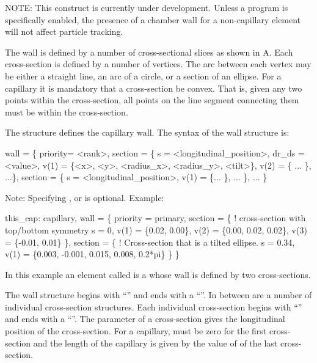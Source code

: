 NOTE: This construct is currently under development. Unless a program
is specifically enabled, the presence of a chamber wall for a
non-capillary element will not affect particle tracking.

The wall is defined by a number of cross-sectional slices as shown in
A. Each cross-section is defined by a number of
vertices. The arc between each vertex may be either a straight line,
an arc of a circle, or a section of an ellipse. For a capillary it is
mandatory that a cross-section be convex. That is, given any two
points within the cross-section, all points on the line segment
connecting them must be within the cross-section.

The  structure defines the capillary wall. The
syntax of the wall structure is:
\begin{example}
  wall = \{
    priority= <rank>,
    section = \{ 
      s = <longitudinal_position>, 
      dr_ds = <value>,
      v(1) = \{<x>, <y>, <radius_x>, <radius_y>, <tilt>\}, 
      v(2) = \{ ... \},
      ...\},
    section = \{
      s = <longitudinal_position>, 
      v(1) = \{... \},
      ... \},
    ... \}
\end{example}
Note: Specifying ,  or
 is optional. Example:
\begin{example}
  this_cap: capillary, 
    wall = \{   
      priority = primary,
      section = \{ ! cross-section with top/bottom symmetry
        s = 0, v(1) =  \{0.02, 0.00\}, 
        v(2) = \{0.00, 0.02, 0.02\}, v(3) = \{-0.01, 0.01\} \}, 
      section = \{  ! Cross-section that is a tilted ellipse.
        s = 0.34, 
        v(1) = \{0.003, -0.001, 0.015, 0.008, 0.2*pi\} \} \}
\end{example}
In this example an element called  is a 
whose wall is defined by two cross-sections.

The wall structure begins with ``'' and ends with a
``\vn{\}}''. In between are a number of individual cross-section
structures. Each individual cross-section begins with ``'' and ends with a ``\vn{\}}''. The  parameter of a
cross-section gives the longitudinal position of the cross-section.
For a capillary,  must be zero for the first cross-section and
the length of the capillary is given by the value of  of the
last cross-section.

